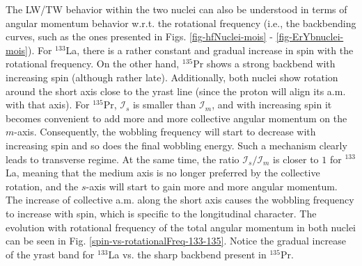 The LW/TW behavior within the two nuclei can also be understood in terms of angular momentum behavior w.r.t. the rotational frequency (i.e., the backbending curves, such as the ones presented in Figs. \ref{fig-hfNuclei-mois} - \ref{fig-ErYbnuclei-mois}). For $^{133}$La, there is a rather constant and gradual increase in spin with the rotational frequency. On the other hand, $^{135}$Pr shows a strong backbend with increasing spin (although rather late). Additionally, both nuclei show rotation around the short axis close to the yrast line (since the proton will align its a.m. with that axis). For $^{135}$Pr, $\mathcal{I}_s$ is smaller than $\mathcal{I}_m$, and with increasing spin it becomes convenient to add more and more collective angular momentum on the $m$-axis. Consequently, the wobbling frequency will start to decrease with increasing spin and so does the final wobbling energy. Such a mechanism clearly leads to transverse regime. At the same time, the ratio $\mathcal{I}_s/\mathcal{I}_m$ is closer to $1$ for $^{133}$La, meaning that the medium axis is no longer preferred by the collective rotation, and the $s$-axis will start to gain more and more angular momentum. The increase of collective a.m. along the short axis causes the wobbling frequency to increase with spin, which is specific to the longitudinal character. The evolution with rotational frequency of the total angular momentum in both nuclei can be seen in Fig. \ref{spin-vs-rotationalFreq-133-135}. Notice the gradual increase of the yrast band for $^{133}$La vs. the sharp backbend present in $^{135}$Pr.
